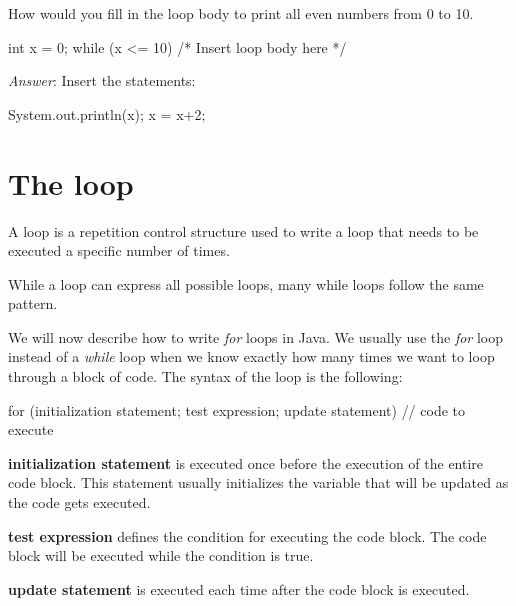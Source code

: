 \begin{example}
How would you fill in the loop body to print all even numbers from 0 to 10.

\begin{code}
int x = 0;
while (x <= 10) {
    /* Insert loop body here */
} 
\end{code}

\emph{Answer}: Insert the statements:
\begin{code}
  System.out.println(x);
  x = x+2;
\end{code}
\end{example}

\section{The  loop}
\begin{definition}
A  loop is a repetition control structure used to write a loop that needs to be executed a specific number of times.
\end{definition}

While a  loop can express all possible loops, many while loops follow the same pattern. 

We will now describe how to write \textit{for} loops in Java. We usually  use the \textit{for} loop instead of a \textit{while} loop when we know exactly how many times we want to loop through a block of code. The syntax of the loop is the following:

\begin{code}
for (initialization statement; test expression; update statement) {
  // code to execute
 }
\end{code}

\textbf{initialization statement} is executed once before the execution of the entire code block. This statement usually initializes the variable that will be updated as the code gets executed.

\textbf{test expression} defines the condition for executing the code block. The code block will be executed while the condition is true.

\textbf{update statement} is executed each time after the code block is executed.


